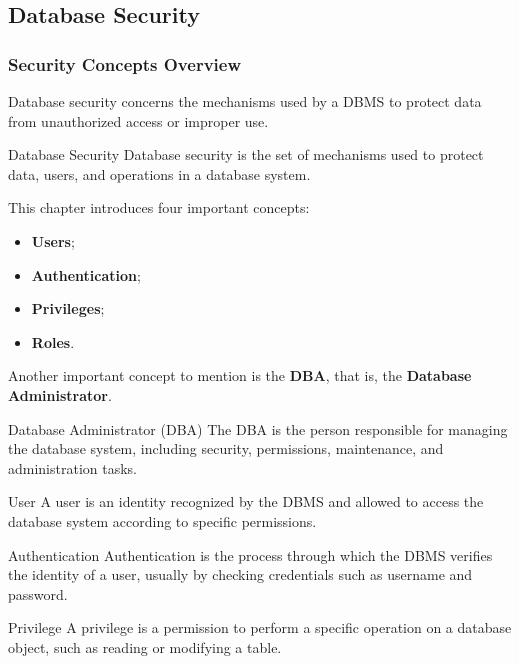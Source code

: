 \subsection{Database Security}

 \subsubsection{Security Concepts Overview}

 Database security concerns the mechanisms used by a DBMS to protect data from unauthorized access or improper use.

 \begin{defbox}{Database Security}
  Database security is the set of mechanisms used to protect data, users, and operations in a database system.
 \end{defbox}

 This chapter introduces four important concepts:
 \begin{itemize}
  \item \textbf{Users};
  \item \textbf{Authentication};
  \item \textbf{Privileges};
  \item \textbf{Roles}.
 \end{itemize}

 Another important concept to mention is the \textbf{DBA}, that is, the \textbf{Database Administrator}.

 \begin{defbox}{Database Administrator (DBA)}
  The DBA is the person responsible for managing the database system, including security, permissions, maintenance, and administration tasks.
 \end{defbox}

 \begin{defbox}{User}
  A user is an identity recognized by the DBMS and allowed to access the database system according to specific permissions.
 \end{defbox}

 \begin{defbox}{Authentication}
  Authentication is the process through which the DBMS verifies the identity of a user, usually by checking credentials such as username and password.
 \end{defbox}

 \begin{defbox}{Privilege}
  A privilege is a permission to perform a specific operation on a database object, such as reading or modifying a table.
 \end{defbox}

